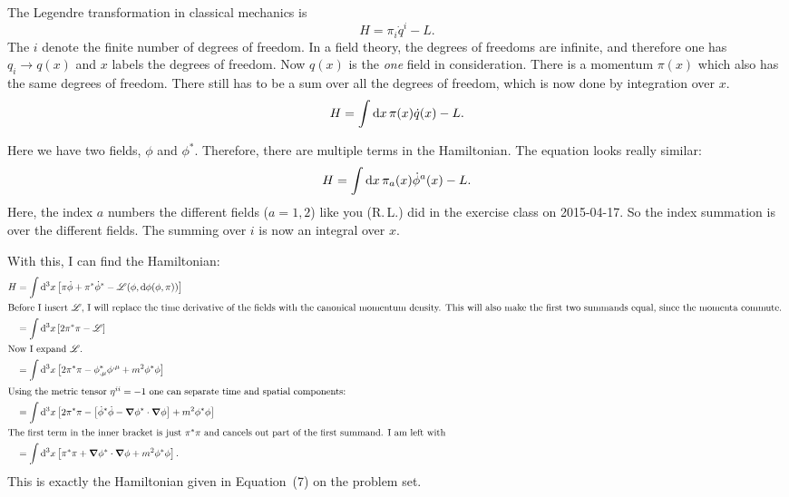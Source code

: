 \documentclass[11pt, english, fleqn, DIV=15, headinclude, BCOR=1cm]{scrartcl}
\begin{document}
The Legendre transformation in classical mechanics is
\begin{equation}
    H = \pi_i \dot q^i - L.
\end{equation}
The $i$ denote the finite number of degrees of freedom. In a field theory, the
degrees of freedoms are infinite, and therefore one has $q_i \to q(x)$ and $x$
labels the degrees of freedom. Now $q(x)$ is the \emph{one} field in
consideration. There is a momentum $\pi(x)$ which also has the same degrees of
freedom. There still has to be a sum over all the degrees of freedom, which is
now done by integration over $x$.
\begin{equation}
    H = \int \mathop{}\!\mathrm d x \, \pi(x) \dot q(x) - L.
\end{equation}

Here we have two fields, $\phi$ and $\phi^*$. Therefore, there are multiple
terms in the Hamiltonian. The equation looks really similar:
\begin{equation}
    H = \int \mathop{}\!\mathrm d x \, \pi_a(x) \dot \phi^a(x) - L.
\end{equation}
Here, the index $a$ numbers the different fields ($a = 1, 2$) like you (R.\,L.)
did in the exercise class on 2015-04-17. So the index summation is over the
different fields. The summing over $i$ is now an integral over $x$.

With this, I can find the Hamiltonian:
\begin{align}
    H
    &= \int \dif^3 x \sbr{\pi \dot \phi + \pi^* \dot\phi^* - \mathscr L(\phi, \dif \phi(\phi,
    \pi))} \\
    \intertext{%
        Before I insert $\mathscr L$, I will replace the time derivative of the
        fields with the canonical momentum density. This will also make the
        first two summands equal, since the momenta commute.
    }
    &= \int \dif^3 x \sbr{2 \pi^* \pi - \mathscr L} \\
    \intertext{%
        Now I expand $\mathscr L$.
    }
    &= \int \dif^3 x \sbr{2 \pi^* \pi - \phi^*_{,\mu} \phi^{,\mu} +
    m^2 \phi^* \phi} \\
    \intertext{%
        Using the metric tensor $\eta^{ii} = -1$ one can separate time and
        spatial components:
    }
    &= \int \dif^3 x \sbr{2 \pi^* \pi - \sbr{\dot \phi^* \dot \phi - \vnabla \phi^* \cdot
    \vnabla \phi} + m^2 \phi^* \phi} \\
    \intertext{%
        The first term in the inner bracket is just $\pi^* \pi$ and cancels out
        part of the first summand. I am left with
    }
    &= \int \dif^3 x \sbr{ \pi^* \pi + \vnabla \phi^* \cdot \vnabla \phi + m^2 \phi^* \phi}.
\end{align}
This is exactly the Hamiltonian given in Equation~(7) on the problem set.
\end{document}
